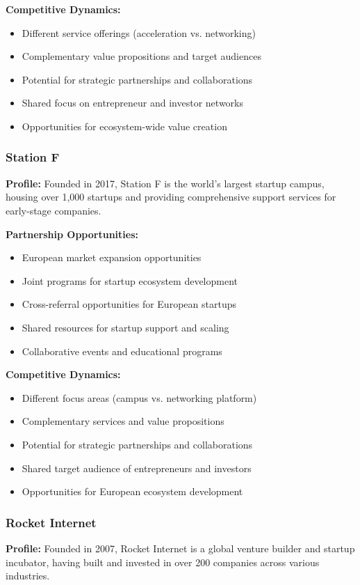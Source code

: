 \textbf{Competitive Dynamics:}
\begin{itemize}
    \item Different service offerings (acceleration vs. networking)
    \item Complementary value propositions and target audiences
    \item Potential for strategic partnerships and collaborations
    \item Shared focus on entrepreneur and investor networks
    \item Opportunities for ecosystem-wide value creation
\end{itemize}

\subsubsection{Station F}
\textbf{Profile:} Founded in 2017, Station F is the world's largest startup campus, housing over 1,000 startups and providing comprehensive support services for early-stage companies.

\textbf{Partnership Opportunities:}
\begin{itemize}
    \item European market expansion opportunities
    \item Joint programs for startup ecosystem development
    \item Cross-referral opportunities for European startups
    \item Shared resources for startup support and scaling
    \item Collaborative events and educational programs
\end{itemize}

\textbf{Competitive Dynamics:}
\begin{itemize}
    \item Different focus areas (campus vs. networking platform)
    \item Complementary services and value propositions
    \item Potential for strategic partnerships and collaborations
    \item Shared target audience of entrepreneurs and investors
    \item Opportunities for European ecosystem development
\end{itemize}

\subsubsection{Rocket Internet}
\textbf{Profile:} Founded in 2007, Rocket Internet is a global venture builder and startup incubator, having built and invested in over 200 companies across various industries.


